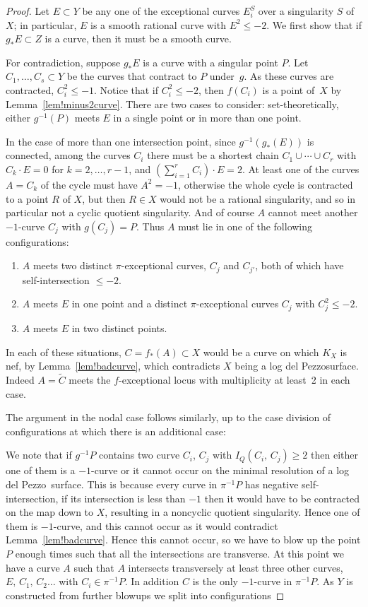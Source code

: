 \documentclass[12pt,a4paper]{book}      %
\theoremstyle{definition}
\newcommand{\ldp}{log del Pezzo}
\newcommand{\wt}[1]{\widetilde #1}
\begin{document}
\begin{proof}
Let $E\subset Y$ be any one of the exceptional curves $E_i^S$ over a singularity $S$ of $X$; in particular, $E$ is
a smooth rational curve with $E^2 \le-2$.
We first show that if $g_* E\subset Z$ is a curve, then it must be a smooth curve. 

For contradiction, suppose $g_*E$ is a curve with a singular point $P$.
Let $C_1,\dots,C_s\subset Y$ be the curves that contract to $P$ under~$g$.
As these curves are contracted, $C_i^2 \leq  -1$.
Notice that if $C_i^2\le-2$, then $f(C_i)$ is a point of~$X$
by Lemma~\ref{lem!minus2curve}.
There are two cases to consider: set-theoretically, either
$g^{-1}(P)$ meets $E$ in a single point or in more than one point.


In the case of more than one intersection point, since $g^{-1}(g_*(E))$ is connected,
among the curves $C_i$ there must be a shortest chain $C_1\cup\cdots\cup C_r$
with $C_k\cdot E=0$ for $k=2,\dots,r-1$, and $\left(\sum_{i=1}^r C_i\right)\cdot E = 2$.
At least one of the curves $A=C_k$ of the cycle must have $A^2=-1$, otherwise the
whole cycle is contracted to a point $R$ of $X$, but then $R\in X$ would not be
a rational singularity, and so in particular not a cyclic quotient singularity.
And of course $A$ cannot meet another $-1$-curve $C_j$ with $g(C_j)=P$.
Thus $A$ must lie in one of the following configurations:
\begin{enumerate}
\item
$A$ meets two distinct $\pi$-exceptional curves, $C_j$ and $C_{j'}$,
both of which have self-intersection $\le-2$.
\item
$A$ meets $E$ in one point and a distinct $\pi$-exceptional curves $C_j$
with $C_j^2\le-2$.
\item
$A$ meets $E$ in two distinct points.
\end{enumerate}
In each of these situations, $C = f_*(A)\subset X$ would be a curve
on which $K_X$ is nef, by Lemma~\ref{lem!badcurve}, which contradicts
$X$ being a \ldp surface. Indeed $A = \wt C$ meets the $f$-exceptional locus with multiplicity
at least~2 in each case.

The argument in the nodal case follows similarly, up to the case division of configurations
at which there is an additional case:

We note that if $g^{-1}{P}$ contains two curve $C_i$, $C_j$ with $I_Q (C_i, \, C_j) \ge 2$ then either one of them is a $-1$-curve or it cannot occur on the minimal resolution of a \ldp\ surface. This is because every curve in $\pi^{-1}{P}$ has negative self-intersection, if its intersection is less than $-1$ then it would have to be contracted on the map down to $X$, resulting in a noncyclic quotient singularity. Hence one of them is $-1$-curve, and this cannot occur as it would contradict Lemma~\ref{lem!badcurve}. Hence this cannot occur, so we have to blow up the point $P$ enough times such that all the intersections are transverse. At this point we have a curve $A$ such that $A$ intersects transversely at least three other curves, $E, \, C_1, \, C_2 \dots $ with $C_i \in \pi^{-1} {P}$. In addition $C$ is the only $-1$-curve in $\pi^{-1}{P}$. As $Y$ is constructed from further blowups we split into configurations 


\end{proof}
\end{document}
